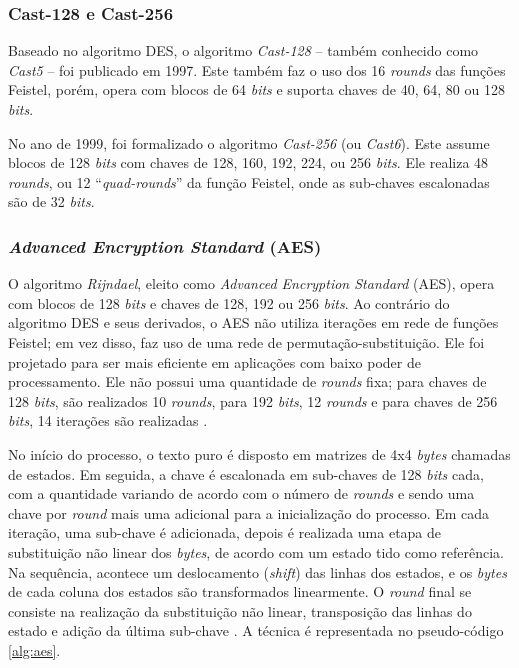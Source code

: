 \documentclass[12pt]{article}
\newcommand{\bits}{\textit{bits}\xspace}
\newcommand{\bytes}{\textit{bytes}\xspace}
\begin{document}
            \subsubsection{Cast-128 e Cast-256}
            \label{subsubsec:cast128}
            
                Baseado no algoritmo DES, o algoritmo \textit{Cast-128} -- também conhecido como \textit{Cast5} -- foi publicado em 1997. Este também faz o uso dos 16 \textit{rounds} das funções Feistel, porém, opera com blocos de 64 \bits e suporta chaves de 40, 64, 80 ou 128 \bits \cite{adams1997cast128}.
                
                No ano de 1999, foi formalizado o algoritmo \textit{Cast-256} (ou \textit{Cast6}). Este assume blocos de 128 \bits com chaves de 128, 160, 192, 224, ou 256 \bits \cite{adams1999cast256}. Ele realiza 48 \textit{rounds}, ou 12 ``\textit{quad-rounds}'' da função Feistel, onde as sub-chaves escalonadas são de 32 \bits \cite{riaz1999cast256fpga}.
            
            \subsubsection{\textit{Advanced Encryption Standard} (AES)}
            \label{subsubsec:aes}
                
                O algoritmo \textit{Rijndael}, eleito como \textit{Advanced Encryption Standard} (AES), opera com blocos de 128 \bits e chaves de 128, 192 ou 256 \bits. Ao contrário do algoritmo DES e seus derivados, o AES não utiliza iterações em rede de funções Feistel; em vez disso, faz uso de uma rede de permutação-substituição. Ele foi projetado para ser mais eficiente em aplicações com baixo poder de processamento. Ele não possui uma quantidade de \textit{rounds} fixa; para chaves de 128 \bits, são realizados 10 \textit{rounds}, para 192 \bits, 12 \textit{rounds} e para chaves de 256 \bits, 14 iterações são realizadas \cite{daemen2013aes}.
                
                No início do processo, o texto puro é disposto em matrizes de 4x4 \bytes chamadas de estados. Em seguida, a chave é escalonada em sub-chaves de 128 \bits cada, com a quantidade variando de acordo com o número de \textit{rounds} e sendo uma chave por \textit{round} mais uma adicional para a inicialização do processo. Em cada iteração, uma sub-chave é adicionada, depois é realizada uma etapa de substituição não linear dos \bytes, de acordo com um estado tido como referência. Na sequência, acontece um deslocamento (\textit{shift}) das linhas dos estados, e os \bytes de cada coluna dos estados são transformados linearmente. O \textit{round} final se consiste na realização da substituição não linear, transposição das linhas do estado e adição da última sub-chave \cite{daemen2013aes}. A técnica é representada no pseudo-código \ref{alg:aes}.
\end{document}
